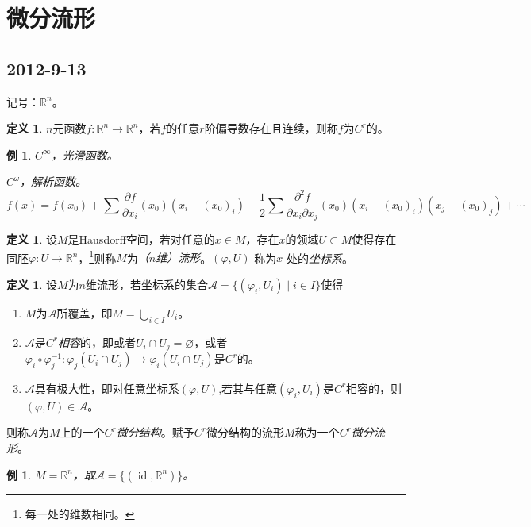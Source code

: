 \documentclass[winfonts,UTF8,c5size,a4paper,fancyhdr,hyperref,titlepage,nocap]{ctexart}
\newtheorem{exa}[thm]{例}
\theoremstyle{definition}
\newtheorem{defn}[thm]{定义}
\theoremstyle{remark}
\numberwithin{equation}{subsection}
\newcommand{\Real}{\mathbb{R}}
\newcommand{\red}{\color{red}}
\newcommand{\id}{\operatorname{id}}
\begin{document}
\section{微分流形}
\subsection*{2012-9-13}
记号：$\Real^n$。
\begin{defn}
  $n$元函数$f:\Real^n\to\Real^n$，若$f$的任意$r$阶偏导数存在且连续，则称$f$为{\red$C^r$}的。
\end{defn}
\begin{exa}
  $C^{\infty}$，{\red 光滑函数}。

  $C^{\omega}$，{\red 解析函数}。
\begin{equation*}
f(x)=f(x_0)+\sum\frac{\partial f}{\partial x_i}(x_0)(x_i-(x_0)_i)+\frac{1}{2}\sum\frac{\partial^2f}{\partial x_i\partial x_j}(x_0)(x_i-(x_0)_i)(x_j-(x_0)_j)+\cdots
\end{equation*}
\end{exa}
\begin{defn}
  设$M$是Hausdorff空间，若对任意的$x\in M$，存在$x$的领域$U\subset M$使得存在同胚$\varphi\colon U\to\Real^n$，\footnote{每一处的维数相同。}则称$M$为{\red \emph{（$n$维）流形}}。$(\varphi, U)$ 称为$x$ 处的{\red \emph{坐标系}}。
\end{defn}
\begin{defn}
  设$M$为$n$维流形，若坐标系的集合$\mathscr{A}=\{(\varphi_i, U_i)\mid i\in I\}$使得
    \begin{enumerate}[1)]
    \setlength{\itemindent}{2ex}
    \item $M$为$\mathscr{A}$所覆盖，即$M=\bigcup\limits_{i\in I}U_i$。
    \item $\mathscr{A}$是{\red\emph{$C^r$相容}}的，即或者$U_i\cap U_j=\varnothing$，或者$\varphi_i\circ\varphi^{-1}_j\colon\varphi_j(U_i\cap U_j)\to\varphi_i(U_i\cap U_j)$是$C^r$的。
    \item $\mathscr{A}$具有极大性，即对任意坐标系$(\varphi, U)$,若其与任意$(\varphi_i, U_i)$是$C^r$相容的，则$(\varphi, U)\in\mathscr{A}$。
  \end{enumerate}
  则称$\mathscr{A}$为$M$上的一个{\red\emph{$C^r$微分结构}}。赋予$C^r$微分结构的流形$M$称为一个{\red\emph{$C^r$微分流形}}。
\end{defn}
\begin{exa}
  $M=\Real^n$，取$\mathscr{A}=\{(\id, \Real^n)\}$。
\end{exa}
\end{document}
